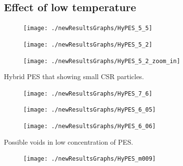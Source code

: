 \documentclass[numbers=noendperiod,chapterprefix=on]{icldt} %
\begin{document}
{%


\subsection{Effect of low temperature}

\begin{figure}[!hp]
\centering
\texttt{[image: ./newResultsGraphs/HyPES\_5\_5]}
\caption{} \label{HyPES_5_5}
\end{figure}
\FloatBarrier

\begin{figure}[!hp]
\centering
\texttt{[image: ./newResultsGraphs/HyPES\_5\_2]}
\caption{} \label{HyPES_5_2}
\end{figure}
\FloatBarrier

\begin{figure}[!hp]
\centering
\texttt{[image: ./newResultsGraphs/HyPES\_5\_2\_zoom\_in]}
\caption{} \label{HyPES_5_2_zoom_in}
\end{figure}
\FloatBarrier

Hybrid PES that showing small CSR particles.

\begin{figure}[!hp]
\centering
\texttt{[image: ./newResultsGraphs/HyPES\_7\_6]}
\caption{} \label{HyPES_7_6}
\end{figure}
\FloatBarrier


\begin{figure}[!hp]
\centering
\texttt{[image: ./newResultsGraphs/HyPES\_6\_05]}
\caption{} \label{HyPES_6_05}
\end{figure}
\FloatBarrier

\begin{figure}[!hp]
\centering
\texttt{[image: ./newResultsGraphs/HyPES\_6\_06]}
\caption{} \label{HyPES_6_06}
\end{figure}
\FloatBarrier

Possible voids in low concentration of PES.
\begin{figure}[!hp]
\centering
\texttt{[image: ./newResultsGraphs/HyPES\_m009]}
\caption{} \label{HyPES_m009}
\end{figure}
\FloatBarrier

}
\end{document}
